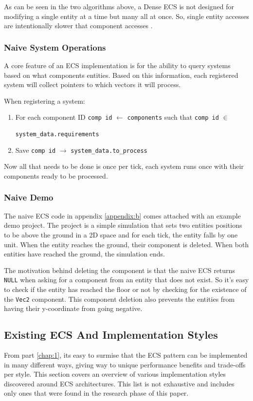 As can be seen in the two algorithms above, a Dense ECS is not designed for modifying a single entity at a time but many all at once. So, single entity accesses are intentionally slower that component accesses \cite{EnTT_SparseSets}.

\subsubsection{Naive System Operations}
A core feature of an ECS implementation is for the ability to query systems based on what components entities. Based on this information, each registered system will collect pointers to which vectors it will process.

When registering a system:
\begin{enumerate}
    \item For each component ID \texttt{comp id} $\leftarrow$ \texttt{components} such that \texttt{comp id} $\in$ 
    
    \texttt{system\_data.requirements}
    \item Save \texttt{comp id} $\rightarrow$ \texttt{system\_data.to\_process }
\end{enumerate}

Now all that needs to be done is once per tick, each system runs once with their components ready to be processed.

\subsubsection{Naive Demo}
The naive ECS code in appendix \ref{appendix:b} comes attached with an example demo project. The project is a simple simulation that sets two entities positions to be above the ground in a 2D space and for each tick, the entity falls by one unit. When the entity reaches the ground, their component is deleted. When both entities have reached the ground, the simulation ends. 

The motivation behind deleting the component is that the naive ECS returns \texttt{NULL} when asking for a component from an entity that does not exist. So it's easy to check if the entity has reached the floor or not by checking for the existence of the \texttt{Vec2} component. This component deletion also prevents the entities from having their y-coordinate from going negative.

\subsection{Existing ECS And Implementation Styles}
From part \ref{chap:1}, its easy to surmise that the ECS pattern can be implemented in many different ways, giving way to unique performance benefits and trade-offs per style. This section covers an overview of various implementation styles discovered around ECS architectures. This list is not exhaustive and includes only ones that were found in the research phase of this paper. 

